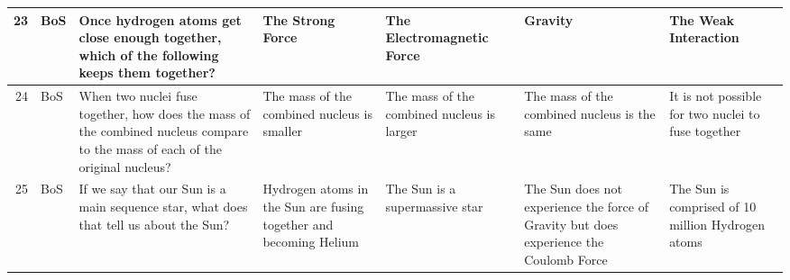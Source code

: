 \documentclass[10pt]{article}
\begin{document}
\begin{tiny}
\begin{longtable}{|r|p{0.375in}|p{1.275in}|p{0.75in}|p{0.75in}|p{0.75in}|p{0.75in}|}
    23    &     BoS &                                                                                                                                                                                       Once hydrogen atoms get close enough together, which of the following keeps them together? &                                                                                                                      The Strong Force &                                                                             The Electromagnetic Force &                                                                                                                    Gravity &                                                                                                              The Weak Interaction \\\hline
    24    &     BoS &                                                                                                                                                    When two nuclei fuse together, how does the mass of the combined nucleus compare to the mass of each of the original nucleus? &                                                                                           The mass of the combined nucleus is smaller &                                                            The mass of the combined nucleus is larger &                                                                               The mass of the combined nucleus is the same &                                                                                It is not possible for two nuclei to fuse together \\\hline
    25    &     BoS &                                                                                                                                                                                            If we say that our Sun is a main sequence star, what does that tell us about the Sun? &                                                                     Hydrogen atoms in the Sun are fusing together and becoming Helium &                                                                        The Sun is a supermassive star &                                     The Sun does not experience the force of Gravity but does experience the Coulomb Force &                                                                                 The Sun is comprised of 10 million Hydrogen atoms \\\hline

\end{longtable}
\end{tiny}
\end{document}
